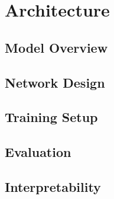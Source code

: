 \section{Architecture}
\label{sec:architecture}


\subsection{Model Overview}
\label{sec:model-overview}

\subsection{Network Design}
\label{sec:network-design}

\subsection{Training Setup}
\label{sec:training-setup}

\subsection{Evaluation}
\label{sec:evaluation}

\subsection{Interpretability}
\label{sec:interpretability}
